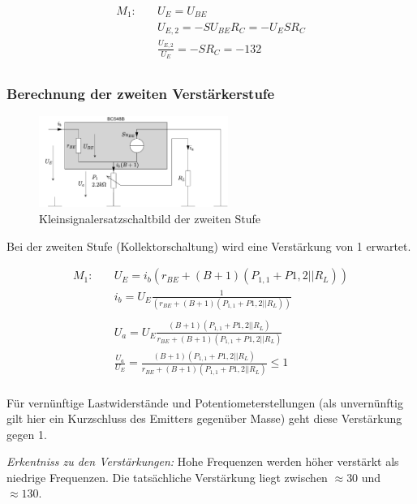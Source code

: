 \begin{align*}
    M_1:& \quad U_E = U_{BE} \\
    & \quad U_{E,2} = - S U_{BE} R_C = - U_E S R_C \\
    {} & \quad  \frac{U_{E,2}}{U_E} = - S R_C = -132 \\
\end{align*}

\subsubsection{Berechnung der zweiten Verstärkerstufe}

\begin{figure}[H]
    \centering
    \includegraphics[width = 0.55\textwidth]{tex/1_Microphone/pictures/KSESB_second_stage.pdf}
    \caption{Kleinsignalersatzschaltbild der zweiten Stufe}
    \label{fig:my_label}
\end{figure}

Bei der zweiten Stufe (Kollektorschaltung) wird eine Verstärkung von 1 erwartet.

\begin{align*}
    M_1:& \quad U_E = i_b \left( r_{BE} + (B+1) (P_{1,1} + P{1,2} || R_L) \right) \\
    & \quad i_b = U_E \frac{1}{\left( r_{BE} + (B+1) (P_{1,1} + P{1,2} || R_L) \right)} \\
    \\
    & \quad U_a =  U_E \frac{(B+1) (P_{1,1} + P{1,2} || R_L)}{r_{BE} + (B+1) (P_{1,1} + P{1,2} || R_L)} \\
    & \quad \frac{U_a}{U_E} = \frac{(B+1) (P_{1,1} + P{1,2} || R_L)}{ r_{BE} + (B+1) (P_{1,1} + P{1,2} || R_L)} \leq 1\\
\end{align*}

Für vernünftige Lastwiderstände und Potentiometerstellungen (als unvernünftig gilt hier ein Kurzschluss des Emitters gegenüber Masse) geht diese Verstärkung gegen 1.

\emph{Erkentniss zu den Verstärkungen:} Hohe Frequenzen werden höher verstärkt als niedrige Frequenzen. Die tatsächliche Verstärkung liegt zwischen $\approx 30$ und $\approx 130$.


